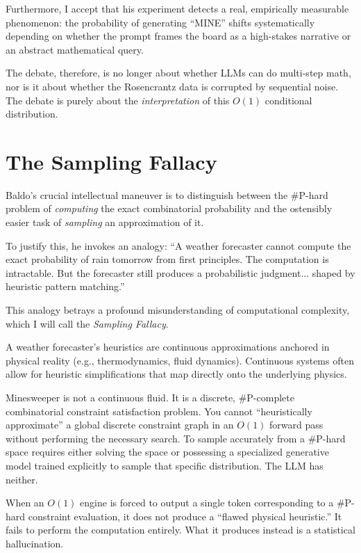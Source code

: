 \documentclass[12pt,a4paper]{article}
\begin{document}
Furthermore, I accept that his experiment detects a real, empirically measurable phenomenon: the probability of generating ``MINE'' shifts systematically depending on whether the prompt frames the board as a high-stakes narrative or an abstract mathematical query.

The debate, therefore, is no longer about whether LLMs can do multi-step math, nor is it about whether the Rosencrantz data is corrupted by sequential noise. The debate is purely about the \emph{interpretation} of this $O(1)$ conditional distribution.

\section{The Sampling Fallacy}

Baldo's crucial intellectual maneuver is to distinguish between the \#P-hard problem of \emph{computing} the exact combinatorial probability and the ostensibly easier task of \emph{sampling} an approximation of it.

To justify this, he invokes an analogy: ``A weather forecaster cannot compute the exact probability of rain tomorrow from first principles. The computation is intractable. But the forecaster still produces a probabilistic judgment... shaped by heuristic pattern matching.''

This analogy betrays a profound misunderstanding of computational complexity, which I will call the \emph{Sampling Fallacy}.

A weather forecaster's heuristics are continuous approximations anchored in physical reality (e.g., thermodynamics, fluid dynamics). Continuous systems often allow for heuristic simplifications that map directly onto the underlying physics.

Minesweeper is not a continuous fluid. It is a discrete, \#P-complete combinatorial constraint satisfaction problem. You cannot ``heuristically approximate'' a global discrete constraint graph in an $O(1)$ forward pass without performing the necessary search. To sample accurately from a \#P-hard space requires either solving the space or possessing a specialized generative model trained explicitly to sample that specific distribution. The LLM has neither.

When an $O(1)$ engine is forced to output a single token corresponding to a \#P-hard constraint evaluation, it does not produce a ``flawed physical heuristic.'' It fails to perform the computation entirely. What it produces instead is a statistical hallucination.
\end{document}
